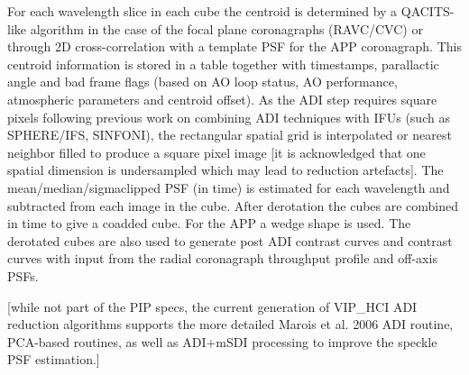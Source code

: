 For each wavelength slice in each cube the centroid is determined by a QACITS-like algorithm 
in the case of the focal plane coronagraphs (RAVC/CVC) or through 2D cross-correlation with 
a template PSF for the APP coronagraph. This centroid information is stored in a table together 
with timestamps, parallactic angle and bad frame flags (based on AO loop status, AO performance, 
atmospheric parameters and centroid offset).
As the ADI step requires square pixels following previous work on combining ADI techniques with IFUs (such as SPHERE/IFS, SINFONI), 
the rectangular spatial grid is interpolated or nearest neighbor filled to produce a square pixel image 
[it is acknowledged that one spatial dimension is undersampled which may lead to reduction artefacts].
The mean/median/sigmaclipped PSF (in time) is estimated for each wavelength and subtracted from each image in the cube. 
After derotation the cubes are combined in time to give a coadded cube. For the APP a wedge shape is used. The derotated cubes are also 
used to generate post ADI contrast curves and contrast curves with input from the radial coronagraph throughput profile and off-axis PSFs.

[while not part of the PIP specs, the current generation of VIP\_HCI ADI reduction algorithms supports
the more detailed Marois et al. 2006 ADI routine, PCA-based routines, as well as ADI+mSDI processing to improve the speckle PSF estimation.]



